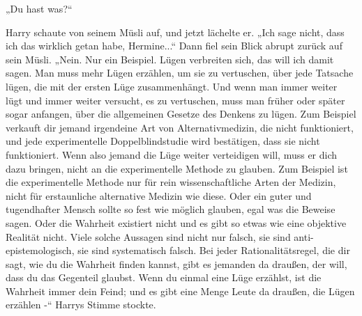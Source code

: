{„Du hast was?“

Harry schaute von seinem Müsli auf, und jetzt lächelte er. „Ich sage nicht, dass ich das wirklich getan habe, Hermine...“ Dann fiel sein Blick abrupt zurück auf sein Müsli. „Nein. Nur ein Beispiel. Lügen verbreiten sich, das will ich damit sagen. Man muss mehr Lügen erzählen, um sie zu vertuschen, über jede Tatsache lügen, die mit der ersten Lüge zusammenhängt. Und wenn man immer weiter lügt und immer weiter versucht, es zu vertuschen, muss man früher oder später sogar anfangen, über die allgemeinen Gesetze des Denkens zu lügen. Zum Beispiel verkauft dir jemand irgendeine Art von Alternativmedizin, die nicht funktioniert, und jede experimentelle Doppelblindstudie wird bestätigen, dass sie nicht funktioniert. Wenn also jemand die Lüge weiter verteidigen will, muss er dich dazu bringen, nicht an die experimentelle Methode zu glauben. Zum Beispiel ist die experimentelle Methode nur für rein wissenschaftliche Arten der Medizin, nicht für erstaunliche alternative Medizin wie diese. Oder ein guter und tugendhafter Mensch sollte so fest wie möglich glauben, egal was die Beweise sagen. Oder die Wahrheit existiert nicht und es gibt so etwas wie eine objektive Realität nicht. Viele solche Aussagen sind nicht nur falsch, sie sind anti-epistemologisch, sie sind systematisch falsch. Bei jeder Rationalitätsregel, die dir sagt, wie du die Wahrheit finden kannst, gibt es jemanden da draußen, der will, dass du das Gegenteil glaubst. Wenn du einmal eine Lüge erzählst, ist die Wahrheit immer dein Feind; und es gibt eine Menge Leute da draußen, die Lügen erzählen -“ Harrys Stimme stockte.

}
